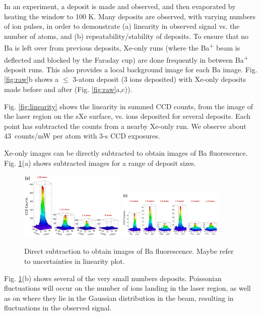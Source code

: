 \documentclass[aps,pra,reprint,superscriptaddress]{revtex4-1}
\begin{document}
In an experiment, a deposit is made and observed, and then evaporated by heating the window to 100 K.  Many deposits are observed, with varying numbers of ion pulses, in order to demonstrate (a) linearity in observed signal vs. the number of atoms, and (b) repeatability/stability of deposits.  To ensure that no Ba is left over from previous deposits, Xe-only runs (where the Ba\textsuperscript{+} beam is deflected and blocked by the Faraday cup) are done frequently in between Ba\textsuperscript{+} deposit runs.  This also provides a local background image for each Ba image.  Fig. \ref{fig:raw}b shows a $\leq$ 3-atom deposit (3 ions deposited) with Xe-only deposits made before and after (Fig. \ref{fig:raw}a,c)).

Fig. \ref{fig:linearity} shows the linearity in summed CCD counts, from the image of the laser region on the sXe surface, vs. ions deposited for several deposits.  Each point has subtracted the counts from a nearby Xe-only run.  We observe about 43~counts/mW per atom with 3-s CCD exposures.

Xe-only images can be directly subtracted to obtain images of Ba fluorescence.  Fig. \ref{fig:lego}(a) shows subtracted images for a range of deposit sizes.  

\begin{figure}[h!tb]
	\includegraphics[width=0.45\textwidth]{figures/lego_varying.png}
	\includegraphics[width=0.45\textwidth]{figures/lego_statistical.png}
	\caption{Direct subtraction to obtain images of Ba fluorescence.  {\color{gray}Maybe refer to uncertainties in linearity plot.}}
	\label{fig:lego}
\end{figure}

Fig. \ref{fig:lego}(b) shows several of the very small numbers deposits.  Poissonian fluctuations will occur on the number of ions landing in the laser region, as well as on where they lie in the Gaussian distribution in the beam, resulting in fluctuations in the observed signal.
\end{document}
